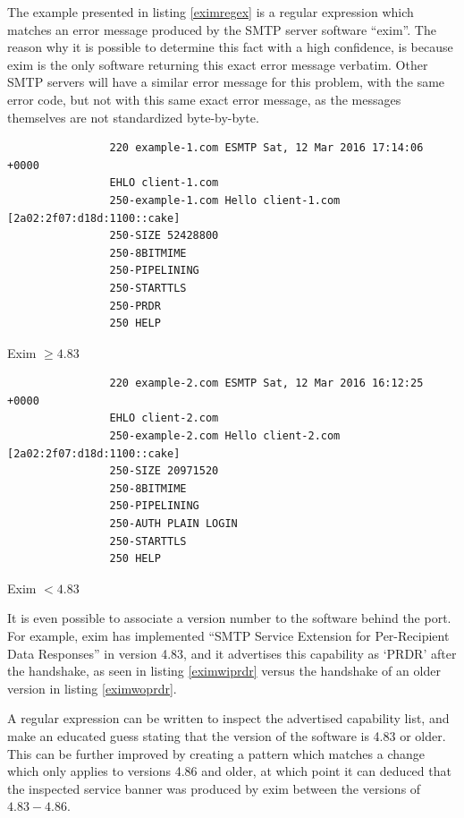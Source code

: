 \documentclass[a4paper,12pt]{article}
\begin{document}
	The example presented in listing \ref{eximregex} is a regular expression which matches an error message produced by the SMTP server software ``exim''. The reason why it is possible to determine this fact with a high confidence, is because exim is the only software returning this exact error message verbatim. Other SMTP servers will have a similar error message for this problem, with the same error code, but not with this same exact error message, as the messages themselves are not standardized byte-by-byte.
	
	\begin{multicols}{2}
		\begin{listing}[H]
			\begin{verbatim}
				220 example-1.com ESMTP Sat, 12 Mar 2016 17:14:06 +0000
				EHLO client-1.com
				250-example-1.com Hello client-1.com [2a02:2f07:d18d:1100::cake]
				250-SIZE 52428800
				250-8BITMIME
				250-PIPELINING
				250-STARTTLS
				250-PRDR
				250 HELP
			\end{verbatim}
			\caption{Exim $\ge 4.83$}
			\label{eximwiprdr}
		\end{listing}
		\begin{listing}[H]
			\begin{verbatim}
				220 example-2.com ESMTP Sat, 12 Mar 2016 16:12:25 +0000
				EHLO client-2.com
				250-example-2.com Hello client-2.com [2a02:2f07:d18d:1100::cake]
				250-SIZE 20971520
				250-8BITMIME
				250-PIPELINING
				250-AUTH PLAIN LOGIN
				250-STARTTLS
				250 HELP
			\end{verbatim}
			\caption{Exim $< 4.83$}
			\label{eximwoprdr}
		\end{listing}
	\end{multicols}
	
	It is even possible to associate a version number to the software behind the port. For example, exim has implemented ``SMTP Service Extension for Per-Recipient Data Responses'' in version 4.83, and it advertises this capability as `PRDR' after the handshake, as seen in listing \ref{eximwiprdr} versus the handshake of an older version in listing \ref{eximwoprdr}.
	
	A regular expression can be written to inspect the advertised capability list, and make an educated guess stating that the version of the software is 4.83 or older. This can be further improved by creating a pattern which matches a change which only applies to versions 4.86 and older, at which point it can deduced that the inspected service banner was produced by exim between the versions of $4.83-4.86$.
	
\end{document}
